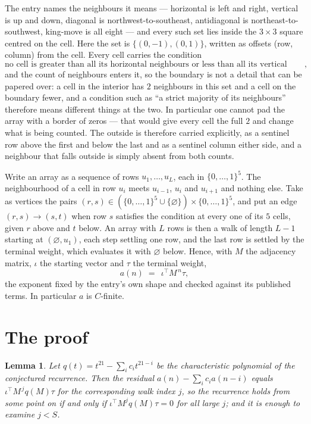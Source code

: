 \documentclass[11pt,a4paper]{article}
\theoremstyle{plain}
\newtheorem{lemma}[theorem]{Lemma}
\theoremstyle{definition}
\begin{document}
The entry names the neighbours it means --- horizontal is left and right, vertical is up and
down, diagonal is northwest-to-southeast, antidiagonal is northeast-to-southwest, king-move is
all eight --- and every such set lies inside the $3\times3$ square centred on the cell. Here
the set is $\{(0,-1), (0,1)\}$, written as offsets (row, column) from the cell. Every cell carries
the condition
\[
\text{no cell is greater than all its horizontal neighbours or less than all its vertical neighbours},
\]
and the count of neighbours enters it, so the boundary is not a detail that can be papered
over: a cell in the interior has $2$ neighbours in this set and a cell on the boundary
fewer, and a condition such as ``a strict majority of its neighbours'' therefore means
different things at the two. In particular one cannot pad the array with a border of zeros ---
that would give every cell the full $2$ and change what is being counted. The outside is
therefore carried
explicitly, as a sentinel row above the first and below the last and as a sentinel column
either side, and a neighbour that falls outside is simply absent from both counts.

Write an array as a sequence of rows $u_1,\dots,u_L$, each in
$\{0,\dots,1\}^{5}$. The neighbourhood of a cell in row $u_i$ meets $u_{i-1}$,
$u_i$ and $u_{i+1}$ and nothing else. Take as vertices the pairs
$(r,s)\in(\{0,\dots,1\}^{5}\cup\{\varnothing\})\times\{0,\dots,1\}^{5}$,
and put an edge $(r,s)\to(s,t)$ when row $s$ satisfies the condition at every one of its
$5$ cells, given $r$ above and $t$ below. An array with $L$ rows is then a walk of length
$L-1$ starting at $(\varnothing,u_1)$, each step settling one row, and the last row is
settled by the terminal weight, which evaluates it with $\varnothing$ below. Hence,
with $M$ the adjacency matrix, $\iota$ the starting vector and $\tau$ the terminal weight,
\[
a(n)\;=\;\,\iota^{\!\top}M^{\,n}\tau ,
\]
the exponent fixed by the entry's own shape and checked against its published terms. In
particular $a$ is $C$-finite.

\section{The proof}

\begin{lemma}\label{lem:crit}
Let $q(t)=t^{21}-\sum_i c_it^{21-i}$ be the characteristic polynomial of the
conjectured recurrence. Then the residual $a(n)-\sum_ic_ia(n-i)$ equals
$\iota^{\!\top}M^{\,j}q(M)\tau$ for the corresponding walk index $j$, so the
recurrence holds from some point on if and only if $\iota^{\!\top}M^{j}q(M)\tau=0$ for all
large $j$; and it is enough to examine $j<S$.
\end{lemma}
\end{document}
